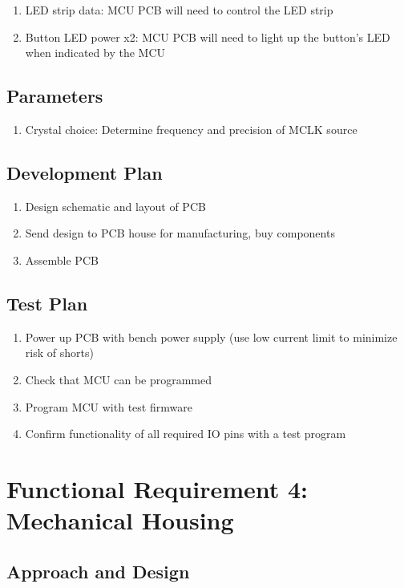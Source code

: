 \documentclass{notes}
\begin{document}
\begin{enumerate}
    \item LED strip data: MCU PCB will need to control the LED strip
    \item Button LED power x2: MCU PCB will need to light up the button's LED when indicated by the MCU
\end{enumerate}

\subsection{Parameters}

\begin{enumerate}
    \item Crystal choice: Determine frequency and precision of MCLK source
\end{enumerate}

\subsection{Development Plan}

\begin{enumerate}
    \item Design schematic and layout of PCB
    \item Send design to PCB house for manufacturing, buy components
    \item Assemble PCB
\end{enumerate}

\subsection{Test Plan}

\begin{enumerate}
    \item Power up PCB with bench power supply (use low current limit to minimize risk of shorts)
    \item Check that MCU can be programmed
    \item Program MCU with test firmware
    \item Confirm functionality of all required IO pins with a test program
\end{enumerate}

\section{Functional Requirement 4: Mechanical Housing}

\subsection{Approach and Design}
\end{document}
